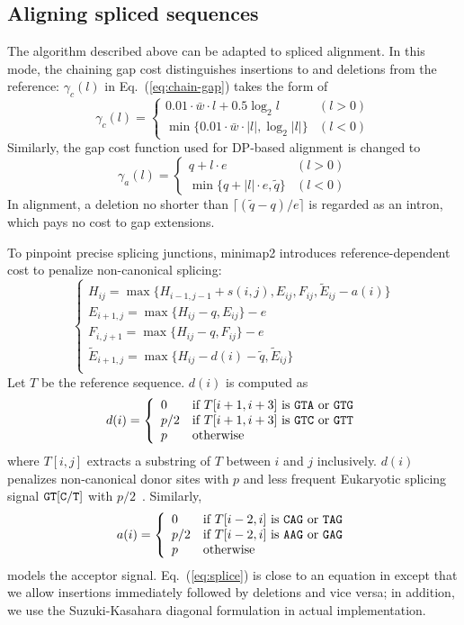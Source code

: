 \documentclass{bioinfo}
\begin{document}
\begin{methods}
\subsection{Aligning spliced sequences}

The algorithm described above can be adapted to spliced alignment. In this
mode, the chaining gap cost distinguishes insertions to and deletions from the
reference: $\gamma_c(l)$ in Eq.~(\ref{eq:chain-gap}) takes the form of
\[
\gamma_c(l)=\left\{\begin{array}{ll}
0.01\cdot\bar{w}\cdot l+0.5\log_2 l & (l>0) \\
\min\{0.01\cdot\bar{w}\cdot|l|,\log_2|l|\} & (l<0)
\end{array}\right.
\]
Similarly, the gap cost function used for DP-based alignment is changed to
\[
\gamma_a(l)=\left\{\begin{array}{ll}
q+l\cdot e & (l>0) \\
\min\{q+|l|\cdot e,\tilde{q}\} & (l<0)
\end{array}\right.
\]
In alignment, a deletion no shorter than $\lceil(\tilde{q}-q)/e\rceil$ is
regarded as an intron, which pays no cost to gap extensions.

To pinpoint precise splicing junctions, minimap2 introduces reference-dependent
cost to penalize non-canonical splicing:
\begin{equation}\label{eq:splice}
\left\{\begin{array}{l}
H_{ij} = \max\{H_{i-1,j-1}+s(i,j),E_{ij},F_{ij},\tilde{E}_{ij}-a(i)\}\\
E_{i+1,j}= \max\{H_{ij}-q,E_{ij}\}-e\\
F_{i,j+1}= \max\{H_{ij}-q,F_{ij}\}-e\\
\tilde{E}_{i+1,j}= \max\{H_{ij}-d(i)-\tilde{q},\tilde{E}_{ij}\}\\
\end{array}\right.
\end{equation}
Let $T$ be the reference sequence. $d(i)$ is computed as
\[d(i)=\left\{\begin{array}{ll}
0 & \mbox{if $T[i+1,i+3]$ is ${\tt GTA}$ or ${\tt GTG}$} \\
p/2 & \mbox{if $T[i+1,i+3]$ is ${\tt GTC}$ or ${\tt GTT}$} \\
p & \mbox{otherwise}
\end{array}\right.\]
where $T[i,j]$ extracts a substring of $T$ between $i$ and $j$ inclusively.
$d(i)$ penalizes non-canonical donor sites with $p$ and less frequent Eukaryotic
splicing signal ${\tt GT[C/T]}$ with $p/2$~\citep{Irimia:2008aa}. Similarly,
\[a(i)=\left\{\begin{array}{ll}
0 & \mbox{if $T[i-2,i]$ is ${\tt CAG}$ or ${\tt TAG}$} \\
p/2 & \mbox{if $T[i-2,i]$ is ${\tt AAG}$ or ${\tt GAG}$} \\
p & \mbox{otherwise}
\end{array}\right.\]
models the acceptor signal. Eq.~(\ref{eq:splice}) is close to an equation in
\citet{Zhang:2006aa} except that we allow insertions immediately followed by
deletions and vice versa; in addition, we use the Suzuki-Kasahara diagonal
formulation in actual implementation.


\end{methods}
\end{document}
